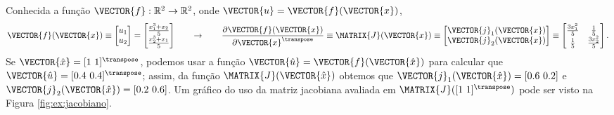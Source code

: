 \begin{example}
Conhecida a função $\VECTOR{f}: \mathbb{R}^2 \rightarrow \mathbb{R}^2$,
onde $\VECTOR{u}=\VECTOR{f}(\VECTOR{x})$, 
\begin{equation}
\VECTOR{f}(\VECTOR{x})\equiv 
\begin{bmatrix}
u_1\\
u_2
\end{bmatrix}
=
\begin{bmatrix}
\frac{x_1^3+x_2}{5}\\
\frac{x_2^3+x_1}{5}
\end{bmatrix}
\qquad \rightarrow \qquad
\frac{\partial \VECTOR{f}(\VECTOR{x}) }{\partial \VECTOR{x}^{\transpose}}\equiv
\MATRIX{J}(\VECTOR{x})\equiv
\begin{bmatrix}
\VECTOR{j}_{1}(\VECTOR{x})\\
\VECTOR{j}_{2}(\VECTOR{x})
\end{bmatrix}\equiv
\begin{bmatrix}
\frac{3 x_1^2}{5} & \frac{1}{5}\\
\frac{1}{5}       & \frac{3 x_2^2}{5}
\end{bmatrix}.
\end{equation}
Se $\VECTOR{\hat{x}}=[1~ 1]^{\transpose}$, podemos usar a função $\VECTOR{\hat{u}}=\VECTOR{f}(\VECTOR{\hat{x}})$ 
para calcular que $\VECTOR{\hat{u}}=[0.4~ 0.4]^{\transpose}$;
assim, da função $\MATRIX{J}(\VECTOR{\hat{x}})$ obtemos que 
$\VECTOR{j}_{1}(\VECTOR{\hat{x}})=[0.6~ 0.2]$ e $\VECTOR{j}_{2}(\VECTOR{\hat{x}})=[0.2~ 0.6]$.
Um gráfico do uso da matriz jacobiana avaliada em $\MATRIX{J}([1~ 1]^{\transpose})$ pode ser visto na Figura \ref{fig:ex:jacobiano}.
\end{example}

